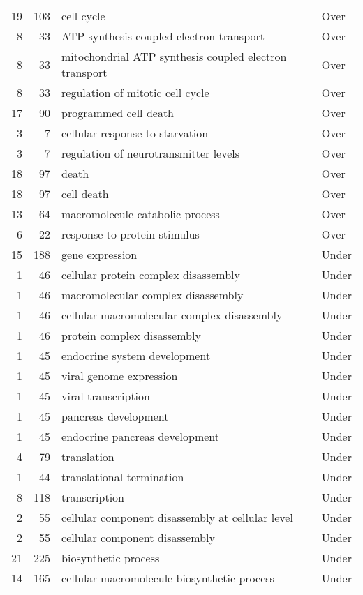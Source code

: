 \documentclass[10pt]{bmc_article}
\newenvironment{bmcformat}{\begin{raggedright}\baselineskip20pt\sloppy\setboolean{publ}{false}}{\end{raggedright}\baselineskip20pt\sloppy}
\begin{document}
\begin{bmcformat}
\begin{longtable}{rrll}
   19 & 103 & cell cycle & Over \\ 
    8 &  33 & ATP synthesis coupled electron transport & Over \\ 
    8 &  33 & mitochondrial ATP synthesis coupled electron transport & Over \\ 
    8 &  33 & regulation of mitotic cell cycle & Over \\ 
   17 &  90 & programmed cell death & Over \\ 
    3 &   7 & cellular response to starvation & Over \\ 
    3 &   7 & regulation of neurotransmitter levels & Over \\ 
   18 &  97 & death & Over \\ 
   18 &  97 & cell death & Over \\ 
   13 &  64 & macromolecule catabolic process & Over \\ 
    6 &  22 & response to protein stimulus & Over \\ 
   15 & 188 & gene expression & Under \\ 
    1 &  46 & cellular protein complex disassembly & Under \\ 
    1 &  46 & macromolecular complex disassembly & Under \\ 
    1 &  46 & cellular macromolecular complex disassembly & Under \\ 
    1 &  46 & protein complex disassembly & Under \\ 
    1 &  45 & endocrine system development & Under \\ 
    1 &  45 & viral genome expression & Under \\ 
    1 &  45 & viral transcription & Under \\ 
    1 &  45 & pancreas development & Under \\ 
    1 &  45 & endocrine pancreas development & Under \\ 
    4 &  79 & translation & Under \\ 
    1 &  44 & translational termination & Under \\ 
    8 & 118 & transcription & Under \\ 
    2 &  55 & cellular component disassembly at cellular level & Under \\ 
    2 &  55 & cellular component disassembly & Under \\ 
   21 & 225 & biosynthetic process & Under \\ 
   14 & 165 & cellular macromolecule biosynthetic process & Under \\ 

\end{longtable}
\end{bmcformat}
\end{document}
